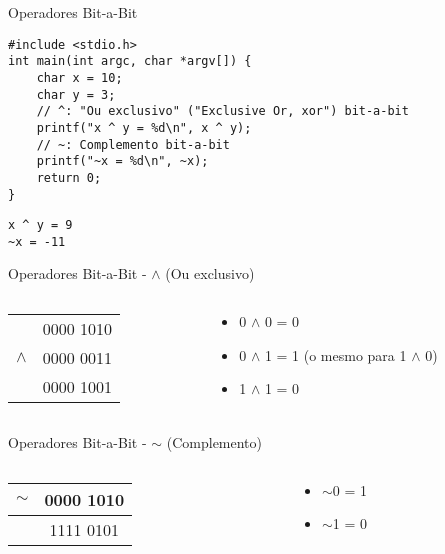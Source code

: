 \documentclass[t, aspectratio=169]{beamer}
\begin{document}
\begin{frame}[label={sec:org785fd86},fragile]{Operadores Bit-a-Bit}
 \vspace{-0.5cm}
\begin{verbatim}
#include <stdio.h>
int main(int argc, char *argv[]) {
    char x = 10;
    char y = 3;
    // ^: "Ou exclusivo" ("Exclusive Or, xor") bit-a-bit
    printf("x ^ y = %d\n", x ^ y);
    // ~: Complemento bit-a-bit
    printf("~x = %d\n", ~x);
    return 0;
}
\end{verbatim}

\begin{verbatim}
x ^ y = 9
~x = -11
\end{verbatim}
\end{frame}

\begin{frame}[label={sec:orga9c63da}]{Operadores Bit-a-Bit - \(\land\) (Ou exclusivo)}
\begin{columns}
\begin{column}{0.5\columnwidth}
\begin{center}
\begin{tabular}{cc}
 & 0000 1010\\
\(\land\) & 0000 0011\\
\hline
 & 0000 1001\\
\end{tabular}
\end{center}
\end{column}

\begin{column}{0.5\columnwidth}
\begin{itemize}
\item 0 \(\land\) 0 = 0
\item 0 \(\land\) 1 = 1 (o mesmo para 1 \(\land\) 0)
\item 1 \(\land\) 1 = 0
\end{itemize}
\end{column}
\end{columns}
\end{frame}

\begin{frame}[label={sec:org98a0bb8}]{Operadores Bit-a-Bit - \(\sim\) (Complemento)}
\begin{columns}
\begin{column}{0.5\columnwidth}
\begin{center}
\begin{tabular}{cc}
\(\sim\) & 0000 1010\\
\hline
 & 1111 0101\\
\end{tabular}
\end{center}
\end{column}

\begin{column}{0.5\columnwidth}
\begin{itemize}
\item \(\sim\)0 = 1
\item \(\sim\)1 = 0
\end{itemize}
\end{column}
\end{columns}
\end{frame}
\end{document}
